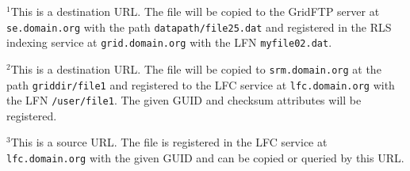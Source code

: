 $^1$This is a destination URL. The file will be copied to the GridFTP
server at \texttt{se.domain.org} with the path \texttt{datapath/file25.dat} and
registered in the RLS indexing service at \texttt{grid.domain.org} with the LFN
\texttt{myfile02.dat}.

$^2$This is a destination URL. The file will be copied to
\texttt{srm.domain.org} at the path \texttt{griddir/file1} and registered to the LFC
service at \texttt{lfc.domain.org} with the LFN \texttt{/user/file1}. The given GUID
and checksum attributes will be registered.

$^3$This is a source URL. The file is registered in the LFC service at
\texttt{lfc.domain.org} with the given GUID and can be copied or queried by
this URL.
